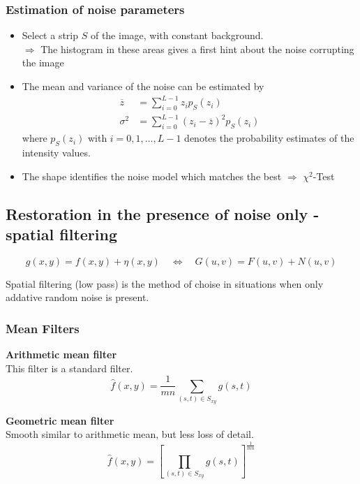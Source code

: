 	\subsubsection{Estimation of noise parameters}
		\begin{itemize}
			\item Select a strip $S$ of the image, with constant background. \\
			$\Rightarrow$ The histogram in these areas gives a first hint about the noise corrupting the image 
			\item The mean and variance of the noise can be estimated by
				\begin{align}
					\overline{z} &= \sum_{i=0}^{L-1} z_i p_S(z_i) \\
					\sigma^2 &= \sum_{i=0}^{L-1} \left(z_i - \overline{z}\right)^2 p_S(z_i)
				\end{align}
				where $p_S(z_i)$ with $i=0,1,\dots,L-1$ denotes the probability estimates of the intensity values.
			\item The shape identifies the noise model which matches the best $\Rightarrow$ $\chi^2$-Test			
		\end{itemize}
		

\subsection{Restoration in the presence of noise only - spatial filtering }
	\[
		g(x,y) = f(x,y) + \eta(x,y) \quad
		\Leftrightarrow \quad
		G(u,v) = F(u,v) + N(u,v)
	\]
	\begin{center}
		Spatial filtering (low pass) is the method of choise in situations when only addative random noise is present.
	\end{center}
	
\subsubsection{Mean Filters}
\textbf{Arithmetic mean filter}\\
This filter is a standard filter.
\begin{equation}
	\hat{f}(x,y)= \frac{1}{m  n} \sum\limits_{(s,t)\in S_{xy}}g(s,t)
\end{equation}

\textbf{Geometric mean filter}\\
Smooth similar to arithmetic mean, but less loss of detail.
\begin{equation}
	\hat{f}(x,y)= \left[\prod\limits_{(s,t)\in S_{xy}} g(s,t)\right]^\frac{1}{mn}
\end{equation}

